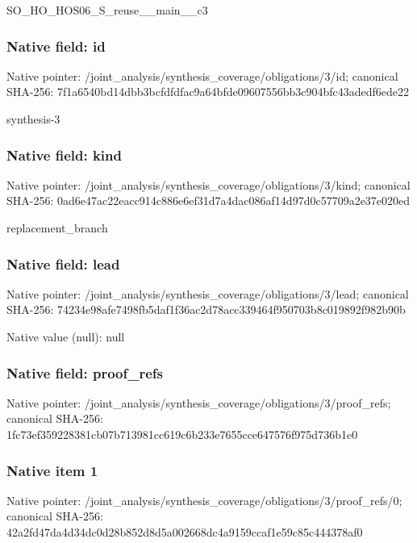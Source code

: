 \documentclass[10pt,a4paper]{article}
\begin{document}
\begingroup\raggedright\sloppy SO\_\allowbreak{}HO\_\allowbreak{}HOS06\_\allowbreak{}S\_\allowbreak{}reuse\_\allowbreak{}\_\allowbreak{}main\_\allowbreak{}\_\allowbreak{}c3\par\endgroup

\subsubsection{Native field: id}
Native pointer: /joint\_\allowbreak{}analysis/synthesis\_\allowbreak{}coverage/obligations/3/id; canonical SHA-256: 7f1a6540bd14dbb3bcfdfdfac9a64bfde09607556bb3c904bfc43adedf6ede22

\begingroup\raggedright\sloppy synthesis-3\par\endgroup

\subsubsection{Native field: kind}
Native pointer: /joint\_\allowbreak{}analysis/synthesis\_\allowbreak{}coverage/obligations/3/kind; canonical SHA-256: 0ad6e47ac22eacc914c886e6ef31d7a4dac086af14d97d0c57709a2e37e020ed

\begingroup\raggedright\sloppy replacement\_\allowbreak{}branch\par\endgroup

\subsubsection{Native field: lead}
Native pointer: /joint\_\allowbreak{}analysis/synthesis\_\allowbreak{}coverage/obligations/3/lead; canonical SHA-256: 74234e98afe7498fb5daf1f36ac2d78acc339464f950703b8c019892f982b90b

Native value (null): null

\subsubsection{Native field: proof\_\allowbreak{}refs}
Native pointer: /joint\_\allowbreak{}analysis/synthesis\_\allowbreak{}coverage/obligations/3/proof\_\allowbreak{}refs; canonical SHA-256: 1fc73ef359228381cb07b713981cc619c6b233e7655cce647576f975d736b1e0

\subsubsection{Native item 1}
Native pointer: /joint\_\allowbreak{}analysis/synthesis\_\allowbreak{}coverage/obligations/3/proof\_\allowbreak{}refs/0; canonical SHA-256: 42a2fd47da4d34dc0d28b852d8d5a002668dc4a9159ccaf1e59c85c444378af0
\end{document}
